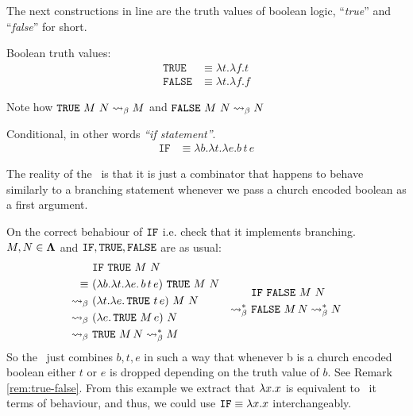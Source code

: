 \documentclass[12pt]{book}
\begin{document}
The next constructions in line are the truth values of boolean logic, ``\textit{true}'' and ``\textit{false}'' for short.
\begin{definition} Boolean truth values:
  \begin{align*}
    \texttt{TRUE} &\equiv \lambda t.\lambda f. t \\
    \texttt{FALSE} &\equiv \lambda t.\lambda f. f
  \end{align*}
\end{definition}
\begin{remark}
  \label{rem:true-false}
  Note how $\texttt{TRUE} \ M \ N \mathrel{\leadsto}_\beta M $ and $ \texttt{FALSE} \ M \ N \mathrel{\leadsto}_\beta N $
\end{remark}
\begin{definition} Conditional, in other words \textit{``if statement''}.
  \begin{align*}
    \texttt{IF} &\equiv \lambda b.\lambda t.\lambda e. b\,t\,e
  \end{align*}
\end{definition}
The reality of the \IF \ is that it is just a combinator that happens to behave similarly to a branching statement whenever we pass a church encoded boolean as a first argument.
\begin{example} On the correct behabiour of $\texttt{IF}$ i.e. check that it implements branching. $ M, N \in \mathbf{\Lambda} $ and $ \texttt{IF}, \texttt{TRUE}, \texttt{FALSE}$ are as usual:
  \[
    \begin{aligned}
      & \IF \ \TRUE \ M \ N \\
      \equiv \ & (\la b.\la t.\la e.\, b\, t\, e) \ \TRUE \ M \ N  \\
      \curly \ & (\la t.\la e.\, \TRUE\ t\, e) \ M \ N  \\
      \curly \ & (\la e.\, \TRUE\ M\, e) \ N  \\
      \curly \ & \TRUE\ M\, N \curly^* M 
    \end{aligned}
    \quad
    \begin{aligned}
      & \IF \ \FALSE \ M \ N \\
      \curly^* \ & \FALSE\ M\, N \curly^* N
    \end{aligned}
  \]
  So the \IF \ just combines $b, t, e$ in such a way that whenever b is a church encoded boolean either $t$ or $e$ is dropped depending on the truth value of $b$. See Remark \ref{rem:true-false}. From this example we extract that $ \lambda x . x $ is equivalent to \IF \ it terms of behaviour, and thus, we could use $ \texttt{IF} \equiv \lambda x . x $ interchangeably.
\end{example}
\end{document}

